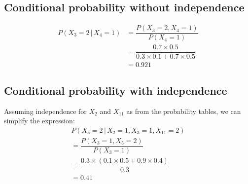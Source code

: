 \documentclass[9pt,twocolumn]{article}
\begin{document}
    \subsection{Conditional probability without independence}
    \begin{equation}
    \begin{split}
        P(X_3=2\,|\,X_4=1) & = \dfrac{P(X_3=2,X_4=1)}{P(X_4=1)}\\
        & = \dfrac{0.7\times0.5}{0.3\times0.1+0.7\times0.5}\\
        & = 0.921
    \end{split}
    \end{equation}

    \subsection{Conditional probability with independence}
    Assuming independence for $X_2$ and $X_11$ as from the probability tables, we can simplify the expression:
    \begin{equation}
    \begin{split}
        P(X_5=2\,|\,X_2=1,X_3=1,X_{11}=2)\\
        = \dfrac{P(X_3=1,X_5=2)}{P(X_3=1)}\\
        = \dfrac{0.3\times(0.1\times0.5+0.9\times0.4)}{0.3}\\
        = 0.41
    \end{split}
    \end{equation}
\end{document}
